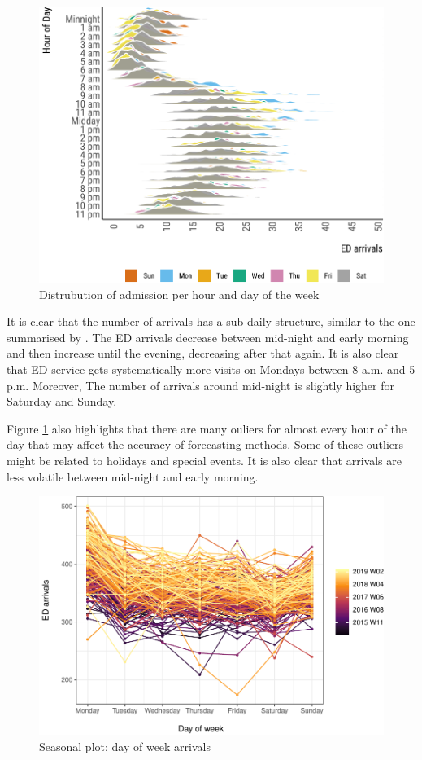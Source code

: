\documentclass[]{elsarticle} %
\begin{document}
\begin{figure}[H]

{\centering \includegraphics{paper_files/figure-latex/hourly-plot-ridge-1} 

}

\caption{Distrubution of admission per hour and day of the week}\label{fig:hourly-plot-ridge}
\end{figure}

It is clear that the number of arrivals has a sub-daily structure, similar to the one summarised by \citet{hertzum2017forecasting}. The ED arrivals decrease between mid-night and early morning and then increase until the evening, decreasing after that again. It is also clear that ED service gets systematically more visits on Mondays between 8 a.m. and 5 p.m. Moreover, The number of arrivals around mid-night is slightly higher for Saturday and Sunday.

Figure \ref{fig:hourly-plot-ridge} also highlights that there are many ouliers for almost every hour of the day that may affect the accuracy of forecasting methods. Some of these outliers might be related to holidays and special events. It is also clear that arrivals are less volatile between mid-night and early morning.

\begin{figure}[H]

{\centering \includegraphics[width=0.7\linewidth]{paper_files/figure-latex/seasonplot-dofw-1} 

}

\caption{Seasonal plot: day of week arrivals}\label{fig:seasonplot-dofw}
\end{figure}
\end{document}

